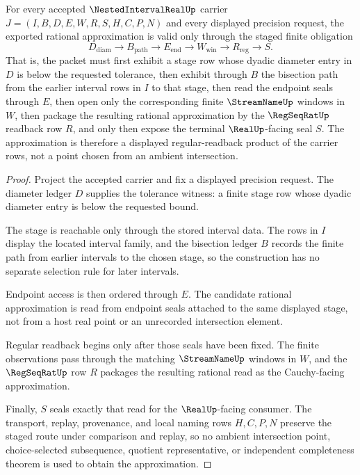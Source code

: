 \begin{theorem}
\label{thm:nested-interval-real-cauchy-selection}
For every accepted $\NestedIntervalRealUp$ carrier $J=(I,B,D,E,W,R,S,H,C,P,N)$ and every displayed precision request, the exported rational approximation is valid only through the staged finite obligation
$$
D_{\mathrm{diam}} \longrightarrow B_{\mathrm{path}} \longrightarrow E_{\mathrm{end}} \longrightarrow W_{\mathrm{win}} \longrightarrow R_{\mathrm{reg}} \longrightarrow S .
$$
That is, the packet must first exhibit a stage row whose dyadic diameter entry in $D$ is below the requested tolerance, then exhibit through $B$ the bisection path from the earlier interval rows in $I$ to that stage, then read the endpoint seals through $E$, then open only the corresponding finite $\StreamNameUp$ windows in $W$, then package the resulting rational approximation by the $\RegSeqRatUp$ readback row $R$, and only then expose the terminal $\RealUp$-facing seal $S$. The approximation is therefore a displayed regular-readback product of the carrier rows, not a point chosen from an ambient intersection.
\end{theorem}
\begin{proof}
Project the accepted carrier and fix a displayed precision request. The diameter ledger $D$ supplies the tolerance witness: a finite stage row whose dyadic diameter entry is below the requested bound.

The stage is reachable only through the stored interval data. The rows in $I$ display the located interval family, and the bisection ledger $B$ records the finite path from earlier intervals to the chosen stage, so the construction has no separate selection rule for later intervals.

Endpoint access is then ordered through $E$. The candidate rational approximation is read from endpoint seals attached to the same displayed stage, not from a host real point or an unrecorded intersection element.

Regular readback begins only after those seals have been fixed. The finite observations pass through the matching $\StreamNameUp$ windows in $W$, and the $\RegSeqRatUp$ row $R$ packages the resulting rational read as the Cauchy-facing approximation.

Finally, $S$ seals exactly that read for the $\RealUp$-facing consumer. The transport, replay, provenance, and local naming rows $H,C,P,N$ preserve the staged route under comparison and replay, so no ambient intersection point, choice-selected subsequence, quotient representative, or independent completeness theorem is used to obtain the approximation.
\end{proof}

